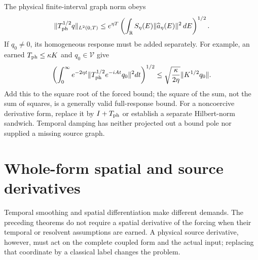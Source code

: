 \documentclass[11pt]{article}
\numberwithin{equation}{section}
\theoremstyle{definition}
\theoremstyle{remark}
\begin{document}
The physical finite-interval graph norm obeys
\begin{equation}\label{p4f:eq:undamping}
 \|T_{\rm ph}^{1/2}q\|_{L^2(0,T)}
 \le e^{\eta T}
       \left(\int_{\mathbb R}S_\eta(E)
                          \|\widehat a_\eta(E)\|^2\,dE\right)^{1/2}.
\end{equation}
If $q_0\ne0$, its homogeneous response must be
added separately. For example, an earned
$T_{\rm ph}\le\kappa K$ and $q_0\in\mathcal V$
give
\[
 \left(\int_0^\infty e^{-2\eta t}
       \|T_{\rm ph}^{1/2}e^{-iAt}q_0\|^2dt\right)^{1/2}
 \le\sqrt{\frac{\kappa}{2\eta}}\|K^{1/2}q_0\|.
 \]
Add this to the square root of the forced bound;
the square of the sum, not the sum of squares,
is a generally valid full-response bound.
For a noncoercive derivative form, replace it by
$I+T_{\rm ph}$ or establish a separate Hilbert-norm
sandwich. Temporal damping has neither projected
out a bound pole nor supplied a missing source graph.

\section{Whole-form spatial and source derivatives}
\label{p4f:sec:derivatives}

Temporal smoothing and spatial differentiation
make different demands. The preceding theorems
do not require a spatial derivative of the forcing
when their temporal or resolvent assumptions are
earned. A physical source derivative, however,
must act on the complete coupled form and the
actual input; replacing that coordinate by a
classical label changes the problem.
\end{document}
